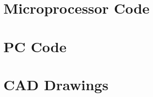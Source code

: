 \documentclass[article,oneside]{memoir}
\begin{document}
\begin{appendices}
    \newpage 
    \newpage 
    \newpage \chapter{Microprocessor Code}
    
    \newpage \chapter{PC Code}
    
    \newpage \chapter{CAD Drawings}
    


\end{appendices}
\end{document}
